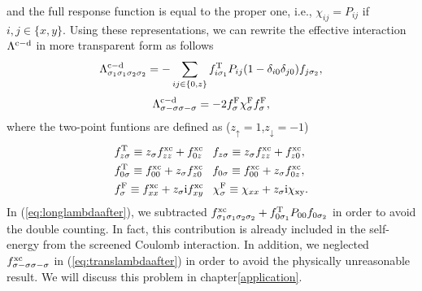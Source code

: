 %
and the full response function is equal to the proper one, i.e., $\chi_{ij} = P_{ij}$ if 
$i, j \in \{x,y\}$.
Using these representations, we can rewrite the effective interaction $\Lambda^{\rm c - \rm d}$ in
more transparent form as follows
%
\begin{equation}
	\Lambda^{\rm c - \rm d}_{\sigma_1\sigma_1\sigma_2\sigma_2} = -
	\sum_{ij \in \{0,z\}} f^{\rm T}_{i\sigma_1}P_{ij}(1-\delta_{i0}\delta_{j0})f_{j\sigma_2},
	\label{eq:longlambdaafter}
\end{equation}
%
\begin{equation}
	\Lambda^{\rm c - \rm d}_{\sigma-\sigma\sigma-\sigma} = -
	2f^{\rm F}_{\sigma}\chi^{\rm F}_{\sigma}f^{\rm F}_{\sigma},
	\label{eq:translambdaafter}
\end{equation}
%
where the two-point funtions are defined as ($z_{\uparrow} = 1$,$z_{\downarrow} = -1$)
%
\begin{equation}
	\begin{split}
	&f^{\rm T}_{z\sigma} \equiv z_{\sigma}f^{\rm xc}_{zz} + f^{\rm xc}_{0z} \;\;\;
	f_{z\sigma} \equiv z_{\sigma}f^{\rm xc}_{zz} + f^{\rm xc}_{z0},\\
	&f^{\rm T}_{0\sigma} \equiv f^{\rm xc}_{00} + z_{\sigma}f^{\rm xc}_{z0} \;\;\;
	f_{0\sigma} \equiv f^{\rm xc}_{00} + z_{\sigma}f^{\rm xc}_{0z}, \\
	&f^{\rm F}_{\sigma} \equiv f^{\rm xc}_{xx} + z_{\sigma}{\rm i}f^{\rm xc}_{xy} \;\;\;
	\chi^{\rm F}_{\sigma} \equiv \chi_{xx} + z_{\sigma}\rm i \chi_{xy}.
	\label{eq:fdefine}
\end{split}
\end{equation}
%
In (\ref{eq:longlambdaafter}), we subtracted $f^{\rm xc}_{\sigma_1\sigma_1\sigma_2\sigma_2}+
f^{\rm T}_{0\sigma_1}P_{00}f_{0\sigma_2}$ in order to avoid the double counting.
In fact, this contribution is already included in the self-energy from the screened Coulomb interaction.
In addition, we neglected $f^{\rm xc}_{\sigma-\sigma\sigma-\sigma}$ in (\ref{eq:translambdaafter})
in order to avoid the physically unreasonable result. We will discuss this problem in chapter\ref{application}.

